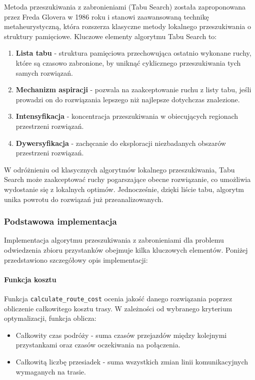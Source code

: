 \documentclass[12pt,a4paper]{article}
\begin{document}
Metoda przeszukiwania z zabronieniami (Tabu Search) została zaproponowana przez Freda Glovera w 1986 roku i stanowi zaawansowaną technikę metaheurystyczną, która rozszerza klasyczne metody lokalnego przeszukiwania o struktury pamięciowe. Kluczowe elementy algorytmu Tabu Search to:

\begin{enumerate}
    \item \textbf{Lista tabu} - struktura pamięciowa przechowująca ostatnio wykonane ruchy, które są czasowo zabronione, by uniknąć cyklicznego przeszukiwania tych samych rozwiązań.
    \item \textbf{Mechanizm aspiracji} - pozwala na zaakceptowanie ruchu z listy tabu, jeśli prowadzi on do rozwiązania lepszego niż najlepsze dotychczas znalezione.
    \item \textbf{Intensyfikacja} - koncentracja przeszukiwania w obiecujących regionach przestrzeni rozwiązań.
    \item \textbf{Dywersyfikacja} - zachęcanie do eksploracji niezbadanych obszarów przestrzeni rozwiązań.
\end{enumerate}

W odróżnieniu od klasycznych algorytmów lokalnego przeszukiwania, Tabu Search może zaakceptować ruchy pogarszające obecne rozwiązanie, co umożliwia wydostanie się z lokalnych optimów. Jednocześnie, dzięki liście tabu, algorytm unika powrotu do rozwiązań już przeanalizowanych.

\subsubsection{Podstawowa implementacja}
Implementacja algorytmu przeszukiwania z zabronieniami dla problemu odwiedzenia zbioru przystanków obejmuje kilka kluczowych elementów. Poniżej przedstawiono szczegółowy opis implementacji:

\paragraph{Funkcja kosztu}
Funkcja \texttt{calculate\_route\_cost} ocenia jakość danego rozwiązania poprzez obliczenie całkowitego kosztu trasy. W zależności od wybranego kryterium optymalizacji, funkcja oblicza:
\begin{itemize}
    \item Całkowity czas podróży - suma czasów przejazdów między kolejnymi przystankami oraz czasów oczekiwania na połączenia.
    \item Całkowitą liczbę przesiadek - suma wszystkich zmian linii komunikacyjnych wymaganych na trasie.
\end{itemize}
\end{document}
